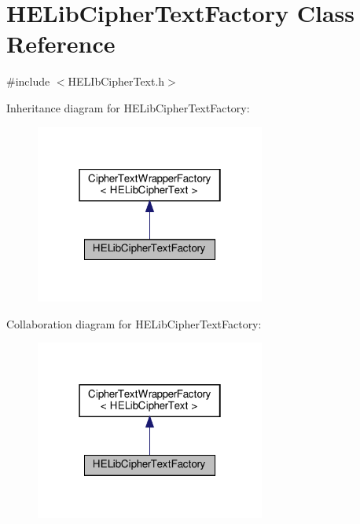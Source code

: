 \hypertarget{classHELibCipherTextFactory}{}\section{H\+E\+Lib\+Cipher\+Text\+Factory Class Reference}
\label{classHELibCipherTextFactory}


{\ttfamily \#include $<$H\+E\+L\+Ib\+Cipher\+Text.\+h$>$}



Inheritance diagram for H\+E\+Lib\+Cipher\+Text\+Factory\+:
\nopagebreak
\begin{figure}[H]
\begin{center}
\leavevmode
\includegraphics[width=214pt]{classHELibCipherTextFactory__inherit__graph}
\end{center}
\end{figure}


Collaboration diagram for H\+E\+Lib\+Cipher\+Text\+Factory\+:
\nopagebreak
\begin{figure}[H]
\begin{center}
\leavevmode
\includegraphics[width=214pt]{classHELibCipherTextFactory__coll__graph}
\end{center}
\end{figure}
